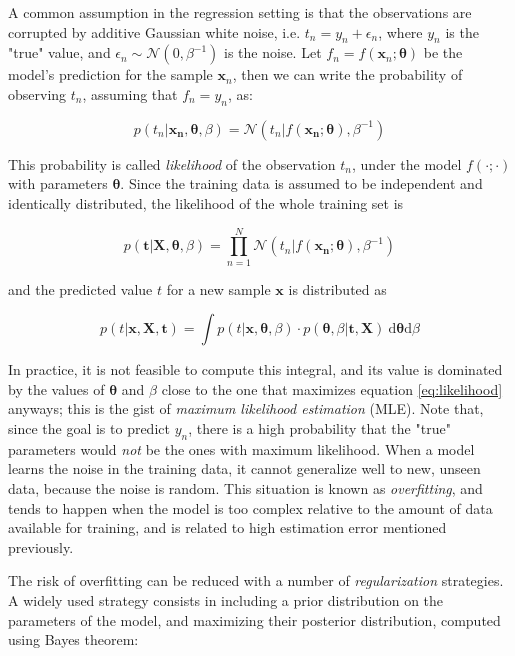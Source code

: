 \documentclass[a4paper,11pt]{kth-mag}
\begin{document}
A common assumption in the regression setting is that the observations are corrupted by additive Gaussian white noise, i.e. $t_n=y_n+\epsilon_n$, where $y_n$ is the "true" value, and $\epsilon_n\sim\mathcal{N}(0,\beta^{-1})$ is the noise. Let $f_n=f(\bm x_n;\bm{\theta})$ be the model's prediction for the sample $\bm x_n$, then we can write the probability of observing $t_n$, assuming that $f_n=y_n$, as:

\begin{equation}
\label{eq:model_pred_distrib}
p(t_n\vert \bm{x_n},\bm\theta,\beta)=\mathcal{N}(t_n\vert f(\bm{x_n};\bm\theta),\beta^{-1})
\end{equation}

This probability is called \emph{likelihood} of the observation $t_n$, under the model $f(\cdot;\cdot)$ with parameters $\bm{\theta}$. Since the training data is assumed to be independent and identically distributed, the likelihood of the whole training set is

\begin{equation}
\label{eq:likelihood}
p(\bm{t}\vert\bm{X},\bm\theta,\beta)=\prod_{n=1}^N  \mathcal{N}(t_n\vert f(\bm{x_n};\bm\theta),\beta^{-1})
\end{equation}

\noindent and the predicted value $t$ for a new sample $\bm x$ is distributed as

\begin{equation}
p(t\vert \bm x, \bm X, \bm t)=\int
p(t\vert\bm x,\bm\theta,\beta)\cdot p(\bm\theta,\beta\vert \bm t, \bm X)\ \text{d}\bm\theta\text{d}\beta
\end{equation}

In practice, it is not feasible to compute this integral, and its value is dominated by the values of $\bm\theta$ and $\beta$ close to the one that maximizes equation \ref{eq:likelihood} anyways; this is the gist of \emph{maximum likelihood estimation} (MLE). Note that, since the goal is to predict $y_n$, there is a high probability that the "true" parameters would \emph{not} be the ones with maximum likelihood. When a model learns the noise in the training data, it cannot generalize well to new, unseen data, because the noise is random. This situation is known as \emph{overfitting}, and tends to happen when the model is too complex relative to the amount of data available for training, and is related to high estimation error mentioned previously.

The risk of overfitting can be reduced with a number of \emph{regularization} strategies. A widely used strategy consists in including a prior distribution on the parameters of the model, and maximizing their posterior distribution, computed using Bayes theorem:
\end{document}
